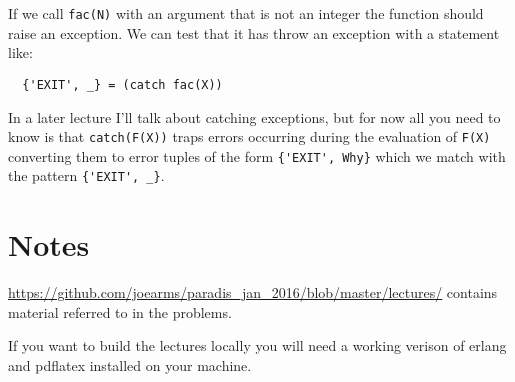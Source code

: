 \documentclass[12pt]{hitec}
\begin{document}
If we call \verb+fac(N)+ with an argument that is not an integer the function
should raise an exception. We can test that it has throw an exception with a
statement like:

\begin{verbatim}
  {'EXIT', _} = (catch fac(X))
\end{verbatim}

In a later lecture I'll talk about catching exceptions, but for now all you need
to know is that \verb+catch(F(X))+ traps errors occurring during the evaluation
of \verb+F(X)+ converting them to error tuples of the form \verb+{'EXIT', Why}+
which we match with the pattern \verb+{'EXIT', _}+.

\section*{Notes}

\href{https://github.com/joearms/paradis\_jan\_2016/blob/master/lectures/}
     {https://github.com/joearms/paradis\_jan\_2016/blob/master/lectures/}
     contains material referred to in the problems.
     
If you want to build the lectures locally you will need a working verison
of erlang and pdflatex installed on your machine.
\end{document}

